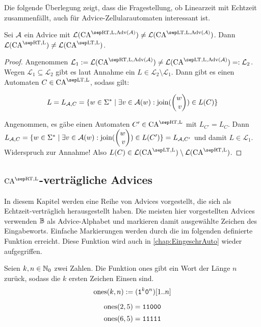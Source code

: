 Die folgende Überlegung zeigt, dass die Fragestellung, ob Linearzeit mit Echtzeit zusammenfällt,
auch für Advice-Zellularautomaten interessant ist.
\begin{satz}
    Sei $\mathcal{A}$ ein Advice mit $\CAL{\CART, \CALeft, \orakel({\advA})} \neq \CAL{\CALT, \CALeft, \orakel({\advA})}$.
    Dann $\CAL{\CART, \CALeft} \neq \CAL{\CALT, \CALeft}$.
\end{satz}
\begin{proof}
    Angenommen $\mathcal{L}_1 := \CAL{\CART, \CALeft, \orakel({\advA})} \neq \CAL{\CALT, \CALeft, \orakel({\advA})} =: \mathcal{L}_2$.
    Wegen $\mathcal{L}_1 \subseteq \mathcal{L}_2$
    gibt es laut Annahme ein $L \in \mathcal{L}_2 \setminus \mathcal{L}_1$.
    Dann gibt es einen Automaten $C \in \CAM{\CALT, \CALeft}$, sodass gilt:
    
    \[
        L = L_{\advA, C} = \set{ w \in \Sigma^*}{\exists v \in \advA(w): \joinw(\Spvek{w; v}) \in L(C)}
    \]
    
    Angenommen, es gäbe einen Automaten $C' \in \CAM{\CART, \CALeft}$ mit $L_{C'} = L_C$.
    Dann $L_{\advA, C} = \set{ w \in \Sigma^*}{\exists v \in \advA(w): \joinw(\Spvek{w; v}) \in L(C')} = L_{\advA, C'}$ und damit
    $L \in \mathcal{L}_1$.
    Widerspruch zur Annahme! Also $L(C) \in \CAL{\CALT, \CALeft} \setminus \CAL{\CART, \CALeft}$.
\end{proof}


\subsection{\texorpdfstring{$\CAM{\CART, \CALeft}$}{CA-RT-L}-verträgliche Advices}

In diesem Kapitel werden eine Reihe von Advices vorgestellt, die sich als Echtzeit-verträglich herausgestellt haben.
Die meisten hier vorgestellten Advices verwenden $\mathbb{B}$ als Advice-Alphabet
und markieren damit ausgewählte Zeichen des Eingabeworts.
Einfache Markierungen werden durch die im folgenden definierte Funktion erreicht.
Diese Funktion wird auch in \cref{chap:EingeschrAuto} wieder aufgegriffen.

\begin{definition}
    Seien $k, n \in \mathbb{N}_0$ zwei Zahlen. Die Funktion $\mathrm{ones}$ gibt ein Wort der Länge $n$ zurück, sodass die $k$ ersten Zeichen Einsen sind.
    \[
        \mathrm{ones}(k, n) := (\texttt{1}^k \texttt{0}^n)[1..n]
    \]
\end{definition}

\begin{exmp}
    \[
        \mathrm{ones}(2, 5) = \texttt{11000}
    \]
    \[
        \mathrm{ones}(6, 5) = \texttt{11111}
    \]        
\end{exmp}

